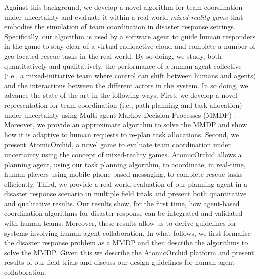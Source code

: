 Against this background, we develop a novel algorithm for team coordination under uncertainty and evaluate it within a real-world \emph{mixed-reality game} \cite{Fischer:etal:2012} that embodies the simulation of team coordination in disaster response settings. Specifically, our algorithm is used by a software agent to guide human responders in the game to stay clear of a virtual radioactive cloud and complete a number of geo-located rescue tasks in the real world. By so doing, we  study, both quantitatively and qualitatively, the performance of a human-agent collective (i.e., a mixed-initiative team where control can shift between humans and agents)  and the interactions between the different actors in the system. In so doing, we  advance the state of the art in the following ways. First, we develop a novel representation for team coordination (i.e., path planning and task allocation) under uncertainty using Multi-agent Markov Decision Processes (MMDP)  \cite{boutilier1996planning}. Moreover, we provide an approximate algorithm to solve the MMDP and show how it  is adaptive to human requests to re-plan task allocations. Second, we present AtomicOrchid, a novel game to evaluate team coordination under uncertainty using the concept of mixed-reality games. AtomicOrchid allows a planning agent, using our task planning algorithm, to coordinate, in real-time, human players using mobile phone-based messaging, to complete rescue tasks efficiently. Third, we provide a real-world evaluation of our planning agent in a disaster response scenario in multiple field trials and present both quantitative and qualitative results. 
Our results show, for the first time, how agent-based coordination algorithms for disaster response can be integrated and validated with human teams. Moreover, these results allow us to derive  guidelines for systems involving  human-agent collaboration.  In what follows, we first formalise the disaster response problem as a MMDP and then describe the algorithms to solve the MMDP. Given this we describe the AtomicOrchid platform and present results of our field trials and discuss our design guidelines for human-agent collaboration.\vspace{-2mm}





